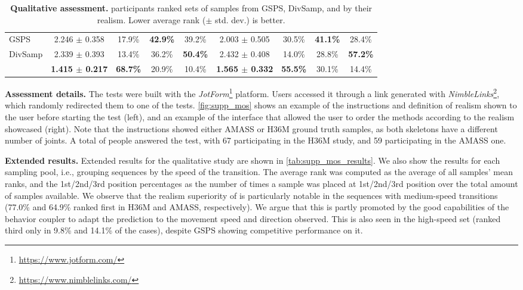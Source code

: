 \documentclass[10pt,twocolumn,letterpaper]{article}
\begin{document}
\begin{table*}[t!]
\begin{tabular}{l@{\hskip 8mm}cccc@{\hskip 8mm}cccc}
        \midrule
        GSPS & 2.246 $\pm$ 0.358 & 17.9\% & \textbf{42.9\%} & 39.2\% & 2.003 $\pm$ 0.505 & 30.5\% & \textbf{41.1\%} & 28.4\% \\
        DivSamp & 2.339 $\pm$ 0.393 & 13.4\% & 36.2\% & \textbf{50.4\%} & 2.432 $\pm$ 0.408 & 14.0\% & 28.8\% & \textbf{57.2\%}  \\
        \modelname{} & \textbf{1.415 $\pm$ 0.217} & \textbf{68.7\%} & 20.9\% & 10.4\% & \textbf{1.565 $\pm$ 0.332} & \textbf{55.5\%} & 30.1\% & 14.4\% \\
        \bottomrule
    \end{tabular}
    \caption{\textbf{Qualitative assessment.} \participants{} participants ranked sets of samples from GSPS, DivSamp, and \modelname{} by their realism. Lower average rank ($\pm$ std. dev.) is better.}
    \label{tab:supp_mos_results}\vspace{-0.3cm}
\end{table*}
\setlength{\tabcolsep}{6pt}


\textbf{Assessment details. } The tests were built with the \textit{JotForm}\footnote{\url{https://www.jotform.com/}} platform. Users accessed it through a link generated with \textit{NimbleLinks}\footnote{\url{https://www.nimblelinks.com/}}, which randomly redirected them to one of the tests. \autoref{fig:supp_mos} shows an example of the instructions and definition of realism shown to the user before starting the test (left), and an example of the interface that allowed the user to order the methods according to the realism showcased (right). Note that the instructions showed either AMASS or H36M ground truth samples, as both skeletons have a different number of joints. A total of \participants{} people answered the test, with 67 participating in the H36M study, and 59 participating in the AMASS one.


\textbf{Extended results.} Extended results for the qualitative study are shown in \autoref{tab:supp_mos_results}. We also show the results for each sampling pool, i.e., grouping sequences by the speed of the transition. The average rank was computed as the average of all samples' mean ranks, and the 1st/2nd/3rd position percentages as the number of times a sample was placed at 1st/2nd/3rd position over the total amount of samples available. We observe that the realism superiority of \modelname{} is particularly notable in the sequences with medium-speed transitions (77.0\% and 64.9\% ranked first in H36M and AMASS, respectively). We argue that this is partly promoted by the good capabilities of the behavior coupler to adapt the prediction to the movement speed and direction observed. This is also seen in the high-speed set (ranked third only in 9.8\% and 14.1\% of the cases), despite GSPS showing competitive performance on it.
 
\end{document}
